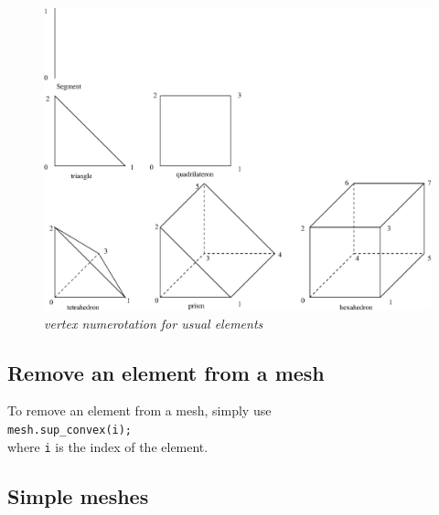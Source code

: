 \documentclass[11pt,a4paper]{article}
\begin{document}
\begin{figure}[htb] \label{fig:elem}
  \begin{center}
    \includegraphics[width=15cm,angle=0]{getfemuser_elem.eps}
  \end{center}
  \caption{ \it vertex numerotation for usual elements }
\end{figure}

\subsection{Remove an element from a mesh}
To remove an element from a mesh, simply use\\[0.5cm]
{\tt mesh.sup\_convex(i); }\\[0.5cm]
where {\tt i} is the index of the element.

\subsection{Simple meshes}
\end{document}
